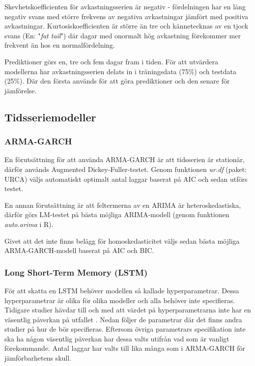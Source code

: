 \documentclass[12pt]{article}
\begin{document}
Skevhetskoefficienten för avkastningsserien är negativ - fördelningen har en lång negativ svans med större frekvens av negativa avkastningar jämfört med positiva avkastningar. Kurtosiskoefficienten är större än tre och kännetecknas av en tjock svans (En: "\emph{fat tail}") där dagar med onormalt hög avkastning förekommer mer frekvent än hos en normalfördelning.





Prediktioner görs en, tre och fem dagar fram i tiden. För att utvärdera modellerna har avkastningsserien delats in i träningsdata (75\%) och testdata (25\%). Där den första används för att göra prediktioner och den senare för jämförelse. 


\subsection{Tidsseriemodeller}
\subsubsection{ARMA-GARCH}
En förutsättning för att använda ARMA-GARCH är att tidsserien är stationär, därför används Augmented Dickey-Fuller-testet. Genom funktionen \textit{ur.df} (paket: URCA) väljs automatiskt optimalt antal laggar baserat på AIC och sedan utförs testet.
\par En annan förutsättning är att feltermerna av en ARIMA är heteroskedastiska, därför görs LM-testet på bästa möjliga ARIMA-modell (genom funktionen \textit{auto.arima} i R). 
\par Givet att det inte finns belägg för homoskedasticitet väljs sedan bästa möjliga ARMA-GARCH-modell baserat på AIC och BIC. 



\subsubsection{Long Short-Term Memory (LSTM)}
För att skatta en LSTM behöver modellen så kallade hyperparametrar. Dessa hyperparametrar är olika för olika modeller och alla behöver inte specifieras. Tidigare studier hävdar till och med att värdet på hyperparametrarna inte har en väsentlig påverkan på utfallet \parencite{dreyfus2005neural}. Nedan följer de parametrar där det finns andra studier på hur de bör specifieras. Eftersom övriga parametrars specifikation inte ska ha någon väsentlig påverkan har dessa valts utifrån vad som är vanligt förekommande. Antal laggar har valts till lika många som i ARMA-GARCH för jämförbarhetens skull.
\end{document}
